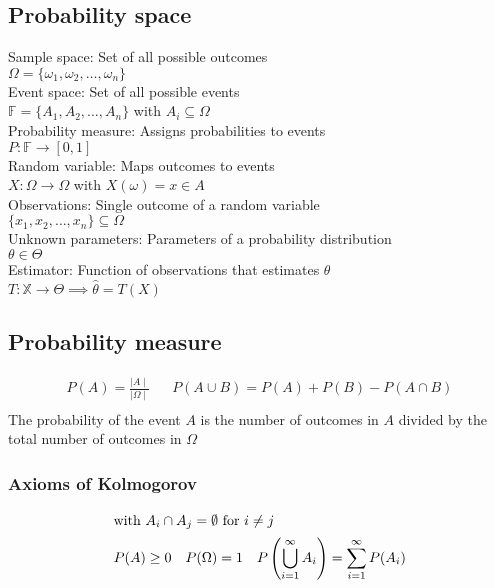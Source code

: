 \begin{mdframed}[style=eqbox]
\subsection{Probability space}
Sample space: Set of all possible outcomes\\
$\Omega = \{ \omega_1, \omega_2, \ldots, \omega_n \}$\\[0.25em]
Event space: Set of all possible events\\
$\mathbb{F} = \{ A_1, A_2, \ldots, A_n \}$ with $A_i \subseteq \Omega$\\[0.25em]
Probability measure: Assigns probabilities to events\\
$P : \mathbb{F} \rightarrow [0,1]$\\[0.25em]
Random variable: Maps outcomes to events\\
$X : \Omega \rightarrow \Omega$ with $X(\omega) = x \in A$\\[0.25em]
Observations: Single outcome of a random variable\\
$\{x_1, x_2, \ldots, x_n\} \subseteq \Omega$\\[0.25em]
Unknown parameters: Parameters of a probability distribution\\
$\theta \in \Theta$\\[0.25em]
Estimator: Function of observations that estimates $\theta$\\
$T: \mathbb{X} \rightarrow \Theta \implies \hat{\theta} = T(X)$
\end{mdframed}

\begin{mdframed}[style=eqbox]
  \subsection{Probability measure}
  \begin{align*}
    P(A) = \frac{\mid A \mid}{\mid \Omega \mid} && P(A \cup B) = P(A) + P(B) - P(A \cap B)\\
  \end{align*}
  The probability of the event $A$ is the number of outcomes in $A$ divided by the total number of outcomes in $\Omega$
  \subsubsection{Axioms of Kolmogorov}
  \begin{align*}
    \shortintertext{with $A_i \cap A_j = \emptyset$ for $i \neq j$}
    P(A) \geq 0 && P(\Omega) = 1 && P\left(\bigcup_{i=1}^{\infty} A_i\right) = \sum_{i=1}^{\infty} P(A_i)\\
  \end{align*}
\end{mdframed}


